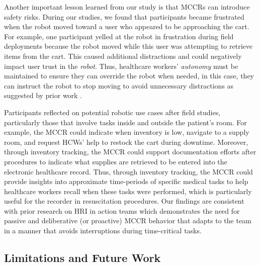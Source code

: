 Another important lesson learned from our study is that MCCRs can introduce safety risks. 
During our studies, we found that participants became frustrated when the robot moved toward a user who appeared to be approaching the cart. 
For example, one participant yelled at the robot in frustration during field deployments because the robot moved while this user was attempting to retrieve items from the cart. 
This caused additional distractions and could negatively impact user trust in the \textit{robot}. 
Thus, healthcare workers' \textit{autonomy} must be maintained to ensure they can override the robot when needed, in this case, they can instruct the robot to stop moving to avoid unnecessary distractions as suggested by prior work \cite{taylor2024towards_blind}.

Participants reflected on potential robotic use cases after field studies, particularly those that involve tasks inside and outside the patient's room. 
For example, the MCCR could indicate when inventory is low, navigate to a supply room, and request HCWs' help to restock the cart during downtime. 
Moreover, through inventory tracking, the MCCR could support documentation efforts after procedures to indicate what supplies are retrieved to be entered into the electronic healthcare record. 
Thus, through inventory tracking, the MCCR could provide insights into approximate time-periods of specific medical tasks to help healthcare workers recall when these tasks were performed, which is particularly useful for the recorder in resuscitation procedures. 
Our findings are consistent with prior research on HRI in action teams which demonstrates the need for passive and deliberative (or proactive) MCCR behavior \cite{jamshad2024taking} that adapts to the team in a manner that avoids interruptions during time-critical tasks.

\subsection{Limitations and Future Work}

